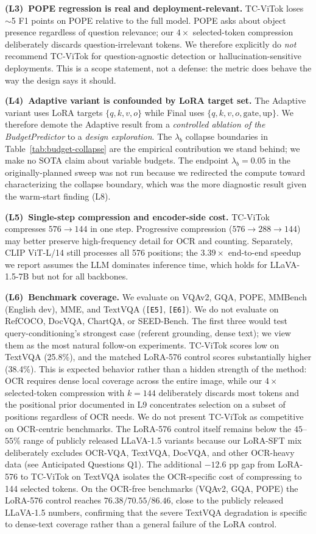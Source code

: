 \documentclass{article}
\begin{document}
\textbf{(L3)~POPE regression is real and deployment-relevant.}
TC-ViTok loses $\sim$5 F1 points on POPE relative to the full model.
POPE asks about object presence regardless of question relevance; our
$4{\times}$ selected-token compression deliberately discards question-irrelevant
tokens. We therefore explicitly do \emph{not} recommend TC-ViTok for
question-agnostic detection or hallucination-sensitive deployments.
This is a scope statement, not a defense: the metric does behave the
way the design says it should.

\textbf{(L4)~Adaptive variant is confounded by LoRA target set.}
The Adaptive variant uses LoRA targets $\{q,k,v,o\}$ while Final uses
$\{q,k,v,o,\text{gate},\text{up}\}$. We therefore demote the Adaptive
result from a \emph{controlled ablation of the BudgetPredictor} to a
\emph{design exploration}. The $\lambda_b$ collapse boundaries in
Table~\ref{tab:budget-collapse} are the empirical contribution we
stand behind; we make no SOTA claim about variable budgets. The
endpoint $\lambda_b{=}0.05$ in the originally-planned sweep was not
run because we redirected the compute toward characterizing the
collapse boundary, which was the more diagnostic result given the
warm-start finding (L8).

\textbf{(L5)~Single-step compression and encoder-side cost.}
TC-ViTok compresses $576 \to 144$ in one step. Progressive compression
($576 \to 288 \to 144$) may better preserve high-frequency detail for
OCR and counting. Separately, CLIP ViT-L/14 still processes all 576
positions; the $3.39\times$ end-to-end speedup we report assumes the
LLM dominates inference time, which holds for LLaVA-1.5-7B but not for
all backbones.

\textbf{(L6)~Benchmark coverage.}
We evaluate on VQAv2, GQA, POPE, MMBench (English dev), MME, and TextVQA
(\texttt{[E5]}, \texttt{[E6]}). We do not evaluate on RefCOCO, DocVQA,
ChartQA, or SEED-Bench. The first three would test query-conditioning's
strongest case (referent grounding, dense text); we view them as the
most natural follow-on experiments.
TC-ViTok scores low on TextVQA (25.8\%), and the matched LoRA-576 control
scores substantially higher (38.4\%). This is expected behavior rather than a
hidden strength of the method: OCR requires dense local coverage across the
entire image, while our $4{\times}$ selected-token compression with $k{=}144$
deliberately discards most tokens and the positional prior documented in L9
concentrates selection on a subset of positions regardless of OCR needs. We do
not present TC-ViTok as competitive on OCR-centric benchmarks. The LoRA-576
control itself remains below the $45$--$55\%$ range of publicly released
LLaVA-1.5 variants because our LoRA-SFT mix deliberately excludes OCR-VQA,
TextVQA, DocVQA, and other OCR-heavy data (see Anticipated Questions Q1).
The additional $-12.6$ pp gap from LoRA-576 to TC-ViTok on TextVQA isolates the
OCR-specific cost of compressing to 144 selected tokens. On the OCR-free
benchmarks (VQAv2, GQA, POPE) the LoRA-576 control reaches
$76.38 / 70.55 / 86.46$, close to the publicly released LLaVA-1.5 numbers,
confirming that the severe TextVQA degradation is specific to dense-text
coverage rather than a general failure of the LoRA control.
\end{document}
